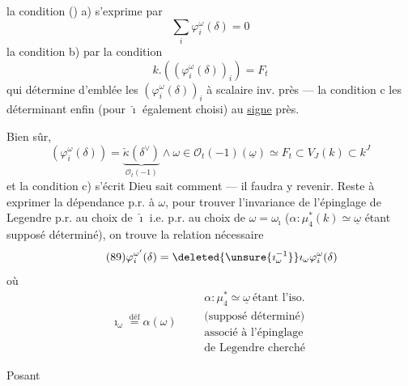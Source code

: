 la condition () a) s'exprime par
\[
\tag{86}
\sum_i\varphi_i^\omega(\delta)=0
\]
la condition b) par la condition
\[
\tag{87}
k.((\varphi_i^\omega(\delta))_i)=F_t
\]
qui détermine d'emblée les $(\varphi_i^\omega(\delta))_i$ à scalaire inv. près --- la condition c les déterminant enfin (pour $\hat\imath$ également choisi) au \uline{signe} près.

Bien sûr,  
\[
\tag{88}
(\varphi_i^\omega(\delta))=
\underbrace{\check\kappa(\delta^\vee)}_{\mathcal O_t(-1)}
\wedge\omega
\in\mathcal O_t(-1)(\underline\omega)\simeq F_t\subset V_J(k)\subset k^J
\]
et la condition c) s'écrit Dieu sait comment --- il faudra  y revenir. Reste à exprimer la dépendance p.r. à $\omega$, pour  trouver l'invariance de l'épinglage de Legendre p.r. au choix de $\hat\imath$ i.e. p.r. au choix de $\omega=\omega_{\hat\imath}$ ($\alpha:\mu_4^*(k)\simeq\underline\omega$ étant supposé déterminé), on trouve la relation nécessaire
\[
\tag{89}
\varphi_i^{\omega'}(\delta)=\deleted{\unsure{\imath_\omega^{-1}}}\imath_\omega\varphi_i^\omega(\delta)
\]
où
\[
\imath_\omega\overset{\text{déf}}=\alpha(\omega)
\qquad
\begin{gathered}
\alpha:\mu_4^*\simeq\underline\omega\ \text{étant l'iso.}\\
\text{(supposé déterminé)}\\
\text{associé à l'épinglage}\\
\text{de Legendre cherché}
\end{gathered}
\]

Posant
